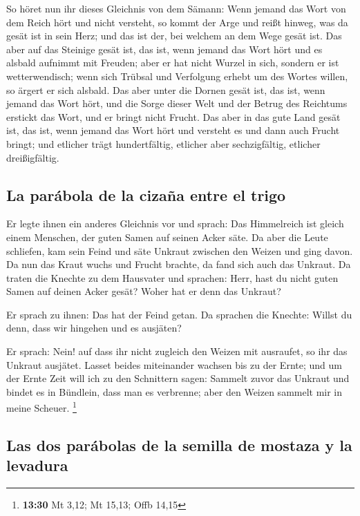  So höret nun ihr dieses Gleichnis von dem Sämann:
 Wenn jemand das Wort von dem Reich hört und nicht
versteht, so kommt der Arge und reißt hinweg, was da gesät ist in sein
Herz; und das ist der, bei welchem an dem Wege gesät ist.
 Das aber auf das Steinige gesät ist, das ist, wenn
jemand das Wort hört und es alsbald aufnimmt mit Freuden;
 aber er hat nicht Wurzel in sich, sondern er ist
wetterwendisch; wenn sich Trübsal und Verfolgung erhebt um des Wortes
willen, so ärgert er sich alsbald.  Das aber unter die
Dornen gesät ist, das ist, wenn jemand das Wort hört, und die Sorge
dieser Welt und der Betrug des Reichtums erstickt das Wort, und er
bringt nicht Frucht.  Das aber in das gute Land gesät
ist, das ist, wenn jemand das Wort hört und versteht es und dann auch
Frucht bringt; und etlicher trägt hundertfältig, etlicher aber
sechzigfältig, etlicher dreißigfältig.

\hypertarget{la-paruxe1bola-de-la-cizauxf1a-entre-el-trigo}{%
\subsection{La parábola de la cizaña entre el
trigo}\label{la-paruxe1bola-de-la-cizauxf1a-entre-el-trigo}}

 Er legte ihnen ein anderes Gleichnis vor und sprach: Das
Himmelreich ist gleich einem Menschen, der guten Samen auf seinen Acker
säte.  Da aber die Leute schliefen, kam sein Feind und
säte Unkraut zwischen den Weizen und ging davon.  Da nun
das Kraut wuchs und Frucht brachte, da fand sich auch das Unkraut.
 Da traten die Knechte zu dem Hausvater und sprachen:
Herr, hast du nicht guten Samen auf deinen Acker gesät? Woher hat er
denn das Unkraut?

 Er sprach zu ihnen: Das hat der Feind getan. Da sprachen
die Knechte: Willst du denn, dass wir hingehen und es ausjäten?

 Er sprach: Nein! auf dass ihr nicht zugleich den Weizen
mit ausraufet, so ihr das Unkraut ausjätet.  Lasset
beides miteinander wachsen bis zu der Ernte; und um der Ernte Zeit will
ich zu den Schnittern sagen: Sammelt zuvor das Unkraut und bindet es in
Bündlein, dass man es verbrenne; aber den Weizen sammelt mir in meine
Scheuer. \footnote{\textbf{13:30} Mt 3,12; Mt 15,13; Offb 14,15}

\hypertarget{las-dos-paruxe1bolas-de-la-semilla-de-mostaza-y-la-levadura}{%
\subsection{Las dos parábolas de la semilla de mostaza y la
levadura}\label{las-dos-paruxe1bolas-de-la-semilla-de-mostaza-y-la-levadura}}

